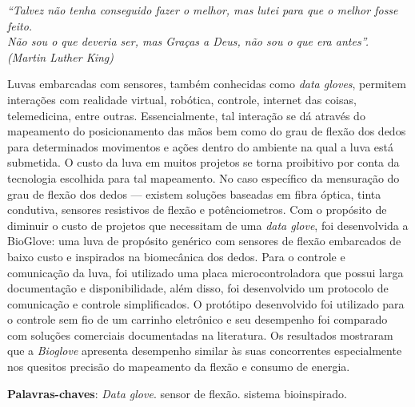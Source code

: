 \documentclass[
	12pt,				%
	openright,			%
	oneside,			%
	a4paper,			%
	english,			%
	brazil				%
	]{abntex2}
\begin{document}
\begin{epigrafe}
    \vspace*{\fill}
	\begin{flushright}
		\textit{``Talvez não tenha conseguido fazer o melhor, mas lutei para que o melhor fosse feito. \\ Não sou o que deveria ser, mas Graças a Deus, não sou o que era antes''. \\ (Martin Luther King)}
	\end{flushright}
\end{epigrafe}


\setlength{\absparsep}{18pt} %
\begin{resumo}
	\hspace{1.5cm}Luvas embarcadas com sensores, também conhecidas como \textit{data gloves}, permitem interações com realidade virtual, robótica, controle, internet das coisas, telemedicina, entre outras. Essencialmente, tal interação se dá através do mapeamento do posicionamento das mãos bem como do grau de flexão dos dedos para determinados movimentos e ações dentro do ambiente na qual a luva está submetida. O custo da luva em muitos projetos se torna proibitivo por conta da tecnologia escolhida para tal mapeamento. No caso específico da  mensuração do grau de flexão dos dedos --- existem soluções baseadas em fibra óptica, tinta condutiva, sensores resistivos de flexão e potênciometros. Com o propósito de diminuir o custo de projetos que necessitam de uma \textit{data glove}, foi desenvolvida a BioGlove: uma luva de propósito genérico com sensores de flexão embarcados de baixo custo e inspirados na biomecânica dos dedos. Para o controle e comunicação da luva, foi utilizado uma placa microcontroladora que possui larga documentação e disponibilidade, além disso, foi desenvolvido um protocolo de comunicação e controle simplificados. O protótipo desenvolvido foi utilizado para o controle sem fio de um carrinho eletrônico e seu desempenho foi comparado com soluções comerciais documentadas na literatura. Os resultados mostraram que a \textit{Bioglove} apresenta desempenho similar às suas concorrentes especialmente nos quesitos precisão do mapeamento da flexão e consumo de energia.
 
	\textbf{Palavras-chaves}: \textit{Data glove}. sensor de flexão. sistema bioinspirado.
\end{resumo}
\end{document}

